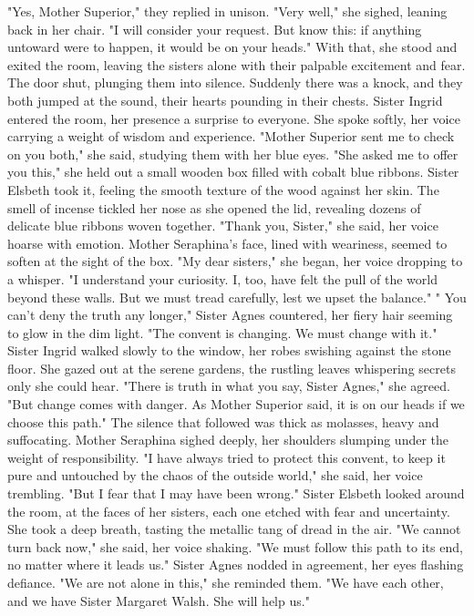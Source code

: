 \documentclass[11pt]{article}
\begin{document}
"Yes, Mother Superior," they replied in unison.
"Very well," she sighed, leaning back in her chair. "I will consider your request. But know this: if anything untoward were to happen, it would be on your heads."
With that, she stood and exited the room, leaving the sisters alone with their palpable excitement and fear. The door shut, plunging them into silence. Suddenly there was a knock, and they both jumped at the sound, their hearts pounding in their chests.
Sister Ingrid entered the room, her presence a surprise to everyone. She spoke softly, her voice carrying a weight of wisdom and experience. "Mother Superior sent me to check on you both," she said, studying them with her blue eyes. "She asked me to offer you this," she held out a small wooden box filled with cobalt blue ribbons.
Sister Elsbeth took it, feeling the smooth texture of the wood against her skin. The smell of incense tickled her nose as she opened the lid, revealing dozens of delicate blue ribbons woven together. "Thank you, Sister," she said, her voice hoarse with emotion.
Mother Seraphina's face, lined with weariness, seemed to soften at the sight of the box. "My dear sisters," she began, her voice dropping to a whisper. "I understand your curiosity. I, too, have felt the pull of the world beyond these walls. But we must tread carefully, lest we upset the balance."
" You can't deny the truth any longer," Sister Agnes countered, her fiery hair seeming to glow in the dim light. "The convent is changing. We must change with it."
Sister Ingrid walked slowly to the window, her robes swishing against the stone floor. She gazed out at the serene gardens, the rustling leaves whispering secrets only she could hear. "There is truth in what you say, Sister Agnes," she agreed. "But change comes with danger. As Mother Superior said, it is on our heads if we choose this path."
The silence that followed was thick as molasses, heavy and suffocating. Mother Seraphina sighed deeply, her shoulders slumping under the weight of responsibility. "I have always tried to protect this convent, to keep it pure and untouched by the chaos of the outside world," she said, her voice trembling. "But I fear that I may have been wrong."
Sister Elsbeth looked around the room, at the faces of her sisters, each one etched with fear and uncertainty. She took a deep breath, tasting the metallic tang of dread in the air. "We cannot turn back now," she said, her voice shaking. "We must follow this path to its end, no matter where it leads us."
Sister Agnes nodded in agreement, her eyes flashing defiance. "We are not alone in this," she reminded them. "We have each other, and we have Sister Margaret Walsh. She will help us."
\end{document}
